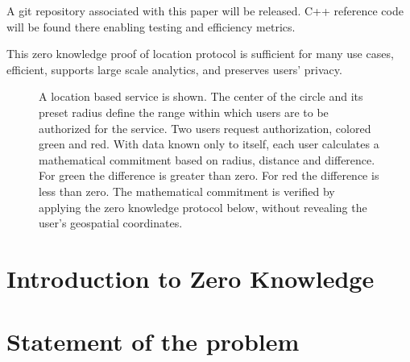 \documentclass{article}
\begin{document}
A git repository associated with this paper will be released. C++ reference code will be found there enabling testing and efficiency metrics. 

This zero knowledge proof of location protocol is sufficient for many use cases, efficient, supports large scale analytics, and preserves users' privacy.

\begin{figure}
  \centering
  \def\svgwidth{\columnwidth}
  
\caption{A location based service is shown.
The center of the circle and its preset radius define the range within which users are to be authorized for the service.
Two users request authorization, colored green and red.
With data known only to itself, each user calculates a mathematical commitment based on radius, distance and difference.
For green the difference is greater than zero.
For red the difference is less than zero.
The mathematical commitment is verified by applying the zero knowledge protocol below, without revealing the user's geospatial coordinates.}
\label{fig-rangeproof}
\end{figure}

\section{Introduction to Zero Knowledge}

\cite{Quisquater89}

\section{Statement of the problem}
\end{document}

